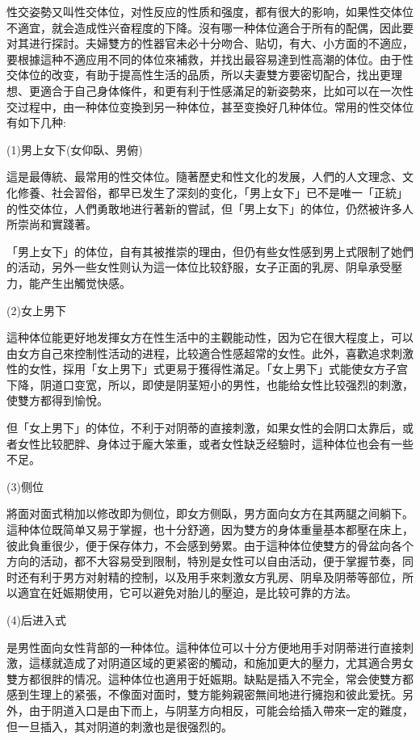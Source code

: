 \documentclass[12pt,UTF8]{ctexbook}
\begin{document}
性交姿勢又叫性交体位，对性反应的性质和强度，都有很大的影响，如果性交体位不適宜，就会造成性兴奋程度的下降。沒有哪一种体位適合于所有的配偶，因此要对其进行探討。夫婦雙方的性器官未必十分吻合、贴切，有大、小方面的不適应，要根據這种不適应用不同的体位來補救，并找出最容易達到性高潮的体位。由于性交体位的改变，有助于提高性生活的品质，所以夫妻雙方要密切配合，找出更理想、更適合于自己身体條件，和更有利于性感滿足的新姿勢來，比如可以在一次性交过程中，由一种体位变換到另一种体位，甚至变換好几种体位。常用的性交体位有如下几种:

(1)男上女下(女仰臥、男俯)

這是最傳統、最常用的性交体位。隨著歷史和性文化的发展，人們的人文理念、文化修養、社会習俗，都早已发生了深刻的变化，「男上女下」已不是唯一「正統」的性交体位，人們勇敢地进行著新的嘗試，但「男上女下」的体位，仍然被许多人所崇尚和實踐著。

「男上女下」的体位，自有其被推崇的理由，但仍有些女性感到男上式限制了她們的活动，另外一些女性则认为這一体位比较舒服，女子正面的乳房、阴阜承受壓力，能产生出觸觉快感。

(2)女上男下

這种体位能更好地发揮女方在性生活中的主觀能动性，因为它在很大程度上，可以由女方自己來控制性活动的进程，比较適合性感超常的女性。此外，喜歡追求刺激性的女性，採用「女上男下」式更易于獲得性滿足。「女上男下」式能使女方子宫下降，阴道口变宽，所以，即使是阴茎短小的男性，也能给女性比较强烈的刺激，使雙方都得到愉悅。

但「女上男下」的体位，不利于对阴蒂的直接刺激，如果女性的会阴口太靠后，或者女性比较肥胖、身体过于龐大笨重，或者女性缺乏经驗时，這种体位也会有一些不足。

(3)侧位

將面对面式稍加以修改即为侧位，即女方侧臥，男方面向女方在其两腿之间躺下。這种体位既简单又易于掌握，也十分舒適，因为雙方的身体重量基本都壓在床上，彼此負重很少，便于保存体力，不会感到勞累。由于這种体位使雙方的骨盆向各个方向的活动，都不大容易受到限制，特別是女性可以自由活动，便于掌握节奏，同时还有利于男方对射精的控制，以及用手來刺激女方乳房、阴阜及阴蒂等部位，所以適宜在妊娠期使用，它可以避免对胎儿的壓迫，是比较可靠的方法。

(4)后进入式

是男性面向女性背部的一种体位。這种体位可以十分方便地用手对阴蒂进行直接刺激，這樣就造成了对阴道区域的更紧密的觸动，和施加更大的壓力，尤其適合男女雙方都很胖的情况。這种体位也適用于妊娠期。缺點是插入不完全，常会使雙方都感到生理上的紧張，不像面对面时，雙方能夠親密無间地进行擁抱和彼此爱抚。另外，由于阴道入口是由下而上，与阴茎方向相反，可能会给插入帶來一定的難度，但一旦插入，其对阴道的刺激也是很强烈的。
\end{document}

